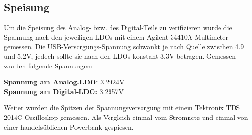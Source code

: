 \subsection{Speisung}
\label{subsec:Speisung}
Um die Speisung des Analog- bzw. des Digital-Teils zu verifizieren wurde die Spannung nach den jeweiligen LDOs mit einem Agilent 34410A Multimeter gemessen. Die USB-Versorgungs-Spannung schwankt je nach Quelle zwischen 4.9 und 5.2V, jedoch sollte sie nach den LDOs konstant 3.3V betragen. Gemessen wurden folgende Spannungen:

\textbf{Spannung am Analog-LDO:} 3.2924V\\
\textbf{Spannung am Digital-LDO:} 3.2957V

Weiter wurden die Spitzen der Spannungsversorgung mit einem Tektronix TDS 2014C Oszilloskop gemessen. Als Vergleich einmal vom Stromnetz und einmal von einer handelsüblichen Powerbank gespiesen.

